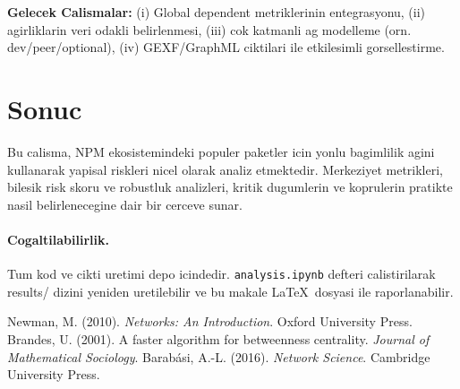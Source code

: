 \documentclass[11pt,a4paper]{article}
\begin{document}
\textbf{Gelecek Calismalar:} (i) Global dependent metriklerinin entegrasyonu, (ii) agirliklarin veri odakli belirlenmesi, (iii) cok katmanli ag modelleme (orn. dev/peer/optional), (iv) GEXF/GraphML ciktilari ile etkilesimli gorsellestirme.

\section{Sonuc}
Bu calisma, NPM ekosistemindeki populer paketler icin yonlu bagimlilik agini kullanarak yapisal riskleri nicel olarak analiz etmektedir. Merkeziyet metrikleri, bilesik risk skoru ve robustluk analizleri, kritik dugumlerin ve koprulerin pratikte nasil belirlenecegine dair bir cerceve sunar.

\paragraph{Cogaltilabilirlik.} Tum kod ve cikti uretimi depo icindedir. \texttt{analysis.ipynb} defteri calistirilarak results/ dizini yeniden uretilebilir ve bu makale \LaTeX~dosyasi ile raporlanabilir.


\begin{thebibliography}{9}
 Newman, M. (2010). \emph{Networks: An Introduction}. Oxford University Press.
 Brandes, U. (2001). A faster algorithm for betweenness centrality. \emph{Journal of Mathematical Sociology}.
 Barab\'asi, A.-L. (2016). \emph{Network Science}. Cambridge University Press.
\end{thebibliography}
\end{document}
